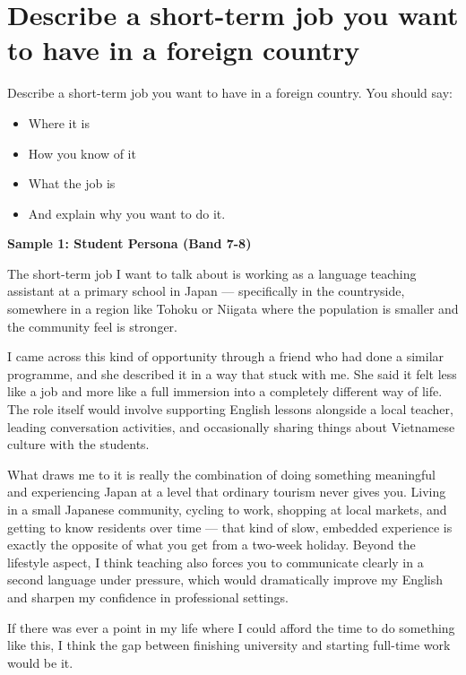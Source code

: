 \section{Describe a short-term job you want to have in a foreign country}
\begin{ieltsprompt}
Describe a short-term job you want to have in a foreign country.
You should say:
\begin{itemize}[leftmargin=2em, itemsep=2pt]
\item Where it is
\item How you know of it
\item What the job is
\item And explain why you want to do it.
\end{itemize}
\end{ieltsprompt}
\begin{ieltsanswer}
\textbf{Sample 1: Student Persona (Band 7-8)}

The short-term job I want to talk about is working as a language teaching assistant at a primary school in Japan — specifically in the countryside, somewhere in a region like Tohoku or Niigata where the population is smaller and the community feel is stronger.

I came across this kind of opportunity through a friend who had done a similar programme, and she described it in a way that stuck with me. She said it felt less like a job and more like a full immersion into a completely different way of life. The role itself would involve supporting English lessons alongside a local teacher, leading conversation activities, and occasionally sharing things about Vietnamese culture with the students.

What draws me to it is really the combination of doing something meaningful and experiencing Japan at a level that ordinary tourism never gives you. Living in a small Japanese community, cycling to work, shopping at local markets, and getting to know residents over time — that kind of slow, embedded experience is exactly the opposite of what you get from a two-week holiday. Beyond the lifestyle aspect, I think teaching also forces you to communicate clearly in a second language under pressure, which would dramatically improve my English and sharpen my confidence in professional settings.

If there was ever a point in my life where I could afford the time to do something like this, I think the gap between finishing university and starting full-time work would be it.


\end{ieltsanswer}
